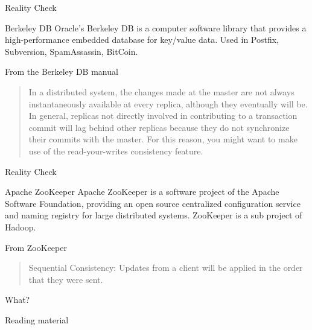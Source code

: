 \begin{frame}{Reality Check}

\begin{block}{Berkeley DB}
Oracle's Berkeley DB is a computer software library that provides a 
high-performance embedded database for key/value data. Used in Postfix,
Subversion, SpamAssassin, BitCoin.
\end{block}

\smallskip
\begin{block}{From the Berkeley DB manual}
\begin{quote}
In a distributed system, the changes made at the master are not always
instantaneously available at every replica, although they \alert{eventually}
will be. In general, replicas not directly involved in contributing to a
transaction commit will lag behind other replicas because they do not
synchronize their commits with the master. For this reason, you might want to
make use of the \alert{read-your-writes} consistency feature.
\end{quote}
\end{block}

\end{frame}

\begin{frame}{Reality Check}

\begin{block}{Apache ZooKeeper}
Apache ZooKeeper is a software project of the Apache Software Foundation,
providing an open source centralized configuration service and naming registry
for large distributed systems. ZooKeeper is a sub project of Hadoop.
\end{block}

\smallskip
\begin{block}{From ZooKeeper}
\begin{quote}
\alert{Sequential Consistency}: Updates from a client will be applied in the order that they were sent.
\end{quote}
\end{block}

\bigskip
What?

\end{frame}

\begin{frame}{Reading material}

\begin{Bib}
{\footnotesize
\BIL
\item {}
\EIL
}
\end{Bib}

% 
%  

\end{frame}

